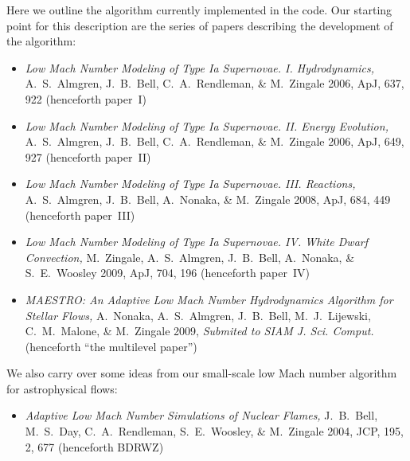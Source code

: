 Here we outline the algorithm currently implemented in the code.  Our
starting point for this description are the series of papers describing
the development of the algorithm:
\begin{itemize}
\item {\em Low Mach Number Modeling of Type Ia
  Supernovae. I. Hydrodynamics,} A.~S.~Almgren, J.~B.~Bell, 
  C.~A.~Rendleman, \& M.~Zingale 2006, ApJ, 637, 922 (henceforth
  paper~I)
\item {\em Low Mach Number Modeling of Type Ia Supernovae. II. Energy
  Evolution,} A.~S.~Almgren, J.~B.~Bell, C.~A.~Rendleman, \& M.~Zingale
  2006, ApJ, 649, 927 (henceforth paper~II)
\item {\em Low Mach Number Modeling of Type Ia Supernovae. III. Reactions,}
  A.~S.~Almgren, J.~B.~Bell, A.~Nonaka, \& M.~Zingale
  2008, ApJ, 684, 449 (henceforth paper~III)
\item {\em Low Mach Number Modeling of Type Ia Supernovae. IV. White Dwarf Convection,}
  M.~Zingale, A.~S.~Almgren, J.~B.~Bell, A.~Nonaka, \& S.~E.~Woosley
  2009, ApJ, 704, 196 (henceforth paper~IV)
\item {\em MAESTRO: An Adaptive Low Mach Number Hydrodynamics Algorithm for Stellar
  Flows,} A.~Nonaka, A.~S.~Almgren, J.~B.~Bell, M.~J.~Lijewski, C.~M.~Malone,
  \& M.~Zingale 2009, {\it Submited to SIAM J. Sci. Comput.}
  (henceforth ``the multilevel paper'')
\end{itemize}
We also carry over some ideas from our small-scale low Mach number algorithm
for astrophysical flows:
\begin{itemize}
\item {\em Adaptive Low Mach Number Simulations of Nuclear Flames,}
J.~B.~Bell, M.~S.~Day, C.~A.~Rendleman, S.~E.~Woosley, \& M.~Zingale
2004, JCP, 195, 2, 677 (henceforth BDRWZ)
\end{itemize}

